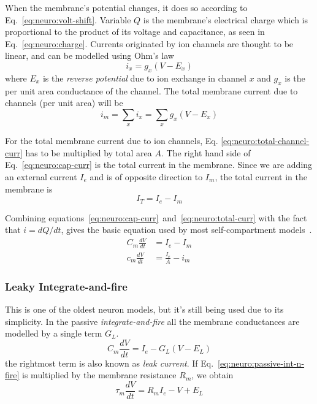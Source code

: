When the membrane's potential changes, it does so according to Eq.~\ref{eq:neuro:volt-shift}. Variable $Q$ is the membrane's electrical charge which is proportional to the product of its voltage and capacitance, as seen in Eq.~\ref{eq:neuro:charge}.
Currents originated by ion channels are thought to be linear, and can be modelled using Ohm's law
\begin{equation}
i_{x} = g_{x}(V - E_{x}) 
\label{eq:neuro:single-channel-curr}
\end{equation}
where $E_{x}$ is the \emph{reverse potential} due to ion exchange in channel $x$ and $g_{x}$ is the per unit area conductance of the channel. The total membrane current due to channels (per unit area) will be 
\begin{equation}
i_{m} = \sum_{x} i_{x} = \sum_{x} g_{x}(V - E_{x}) \label{eq:neuro:total-channel-curr}
\end{equation}

For the total membrane current due to ion channels, Eq. \ref{eq:neuro:total-channel-curr} has to be multiplied by total area $A$.
The right hand side of Eq.~\ref{eq:neuro:cap-curr} is the total current in the membrane. Since we are adding an external current $I_{e}$ and is of opposite direction to $I_{m}$, the total current in the membrane is
\begin{equation}
I_{T} = I_{e} - I_{m} 
\label{eq:neuro:total-curr}
\end{equation}

Combining equations~\ref{eq:neuro:cap-curr}~and~\ref{eq:neuro:total-curr} with the fact that $i=dQ/dt$, gives the basic equation used by most self-compartment models~\cite{dayan2001theoretical}.
\begin{align}
C_{m} \frac{dV}{dt} &= I_{e} - I_{m} 
\label{eq:neuro:basic-self-compartment} \\[0.5em]
c_{m} \frac{dV}{dt} &= \frac{I_{e}}{A} - i_{m}
\label{eq:neuro:basic-pu-self-compartment}
\end{align}


\subsubsection{Leaky Integrate-and-fire}
This is one of the oldest neuron models, but it's still being used due to its simplicity. In the passive \emph{integrate-and-fire} all the membrane conductances are modelled by a single term $G_{L}$.
\begin{equation}
C_{m}\frac{dV}{dt} = I_{e} - G_{L}\left( V - E_{L} \right) 
\label{eq:neuro:passive-int-n-fire}
\end{equation}
the rightmost term is also known as \emph{leak current}. If Eq.~\ref{eq:neuro:passive-int-n-fire} is multiplied by the membrane resistance $R_{m}$, we obtain
\begin{equation}
\tau_{m}\frac{dV}{dt} = R_{m}I_{e} - V + E_{L}  
\label{eq:neuro:passive-R-int-n-fire}
\end{equation}


